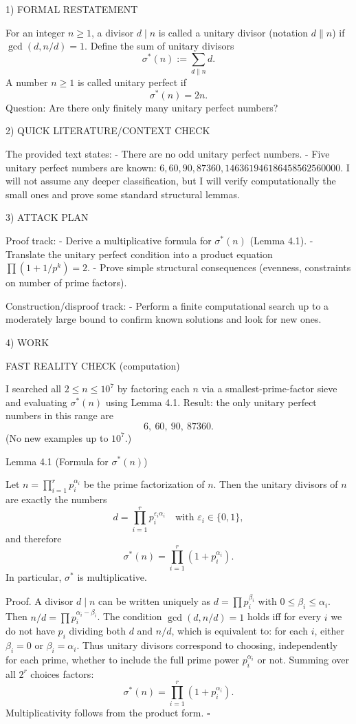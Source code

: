1) FORMAL RESTATEMENT

For an integer $n\ge 1$, a divisor $d\mid n$ is called a unitary divisor (notation $d\parallel n$)
if $\gcd(d,n/d)=1$.
Define the sum of unitary divisors
\[
  \sigma^*(n):=\sum_{d\parallel n} d.
\]
A number $n\ge 1$ is called unitary perfect if
\[
  \sigma^*(n)=2n.
\]
Question: Are there only finitely many unitary perfect numbers?

2) QUICK LITERATURE/CONTEXT CHECK

The provided text states:
- There are no odd unitary perfect numbers.
- Five unitary perfect numbers are known: $6,60,90,87360,146361946186458562560000$.
I will not assume any deeper classification, but I will verify computationally the small ones and prove
some standard structural lemmas.

3) ATTACK PLAN

Proof track:
- Derive a multiplicative formula for $\sigma^*(n)$ (Lemma 4.1).
- Translate the unitary perfect condition into a product equation $\prod (1+1/p^k)=2$.
- Prove simple structural consequences (evenness, constraints on number of prime factors).

Construction/disproof track:
- Perform a finite computational search up to a moderately large bound to confirm known solutions
  and look for new ones.

4) WORK

FAST REALITY CHECK (computation)

I searched all $2\le n\le 10^7$ by factoring each $n$ via a smallest-prime-factor sieve and evaluating
$\sigma^*(n)$ using Lemma 4.1.
Result: the only unitary perfect numbers in this range are
\[
  6,\ 60,\ 90,\ 87360.
\]
(No new examples up to $10^7$.)

Lemma 4.1 (Formula for $\sigma^*(n)$)

Let $n=\prod_{i=1}^r p_i^{\alpha_i}$ be the prime factorization of $n$.
Then the unitary divisors of $n$ are exactly the numbers
\[
  d=\prod_{i=1}^r p_i^{\varepsilon_i\alpha_i}\quad\text{with }\varepsilon_i\in\{0,1\},
\]
and therefore
\[
  \sigma^*(n)=\prod_{i=1}^r (1+p_i^{\alpha_i}).
\]
In particular, $\sigma^*$ is multiplicative.

Proof.
A divisor $d\mid n$ can be written uniquely as $d=\prod p_i^{\beta_i}$ with $0\le \beta_i\le \alpha_i$.
Then $n/d=\prod p_i^{\alpha_i-\beta_i}$.
The condition $\gcd(d,n/d)=1$ holds iff for every $i$ we do not have $p_i$ dividing both $d$ and $n/d$,
which is equivalent to: for each $i$, either $\beta_i=0$ or $\beta_i=\alpha_i$.
Thus unitary divisors correspond to choosing, independently for each prime, whether to include the full
prime power $p_i^{\alpha_i}$ or not.
Summing over all $2^r$ choices factors:
\[
  \sigma^*(n)=\prod_{i=1}^r (1+p_i^{\alpha_i}).
\]
Multiplicativity follows from the product form.
$\square$

